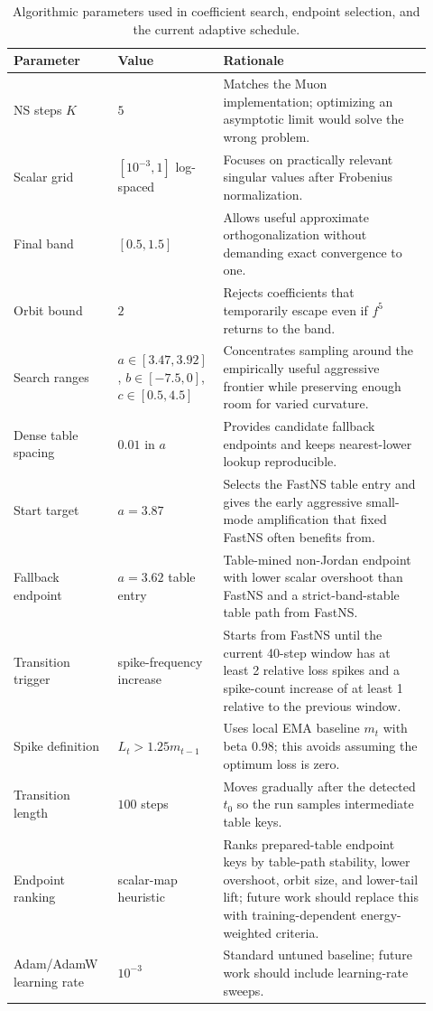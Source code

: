 \documentclass[11pt]{article}
\begin{document}
\begin{table}[H]
\centering
\small
\begin{tabular}{p{0.24\linewidth}p{0.20\linewidth}p{0.48\linewidth}}
\toprule
Parameter & Value & Rationale \\
\midrule
NS steps $K$ & $5$ & Matches the Muon implementation; optimizing an asymptotic limit would solve the wrong problem. \\
Scalar grid & $[10^{-3},1]$ log-spaced & Focuses on practically relevant singular values after Frobenius normalization. \\
Final band & $[0.5,1.5]$ & Allows useful approximate orthogonalization without demanding exact convergence to one. \\
Orbit bound & $2$ & Rejects coefficients that temporarily escape even if $f^5$ returns to the band. \\
Search ranges & $a\in[3.47,3.92]$, $b\in[-7.5,0]$, $c\in[0.5,4.5]$ & Concentrates sampling around the empirically useful aggressive frontier while preserving enough room for varied curvature. \\
Dense table spacing & $0.01$ in $a$ & Provides candidate fallback endpoints and keeps nearest-lower lookup reproducible. \\
Start target & $a=3.87$ & Selects the FastNS table entry and gives the early aggressive small-mode amplification that fixed FastNS often benefits from. \\
Fallback endpoint & $a=3.62$ table entry & Table-mined non-Jordan endpoint with lower scalar overshoot than FastNS and a strict-band-stable table path from FastNS. \\
Transition trigger & spike-frequency increase & Starts from FastNS until the current 40-step window has at least 2 relative loss spikes and a spike-count increase of at least 1 relative to the previous window. \\
Spike definition & $L_t > 1.25 m_{t-1}$ & Uses local EMA baseline $m_t$ with beta $0.98$; this avoids assuming the optimum loss is zero. \\
Transition length & $100$ steps & Moves gradually after the detected $t_0$ so the run samples intermediate table keys. \\
Endpoint ranking & scalar-map heuristic & Ranks prepared-table endpoint keys by table-path stability, lower overshoot, orbit size, and lower-tail lift; future work should replace this with training-dependent energy-weighted criteria. \\
Adam/AdamW learning rate & $10^{-3}$ & Standard untuned baseline; future work should include learning-rate sweeps. \\
\bottomrule
\end{tabular}
\caption{Algorithmic parameters used in coefficient search, endpoint selection, and the current adaptive schedule.}
\label{tab:algorithm-parameters}
\end{table}
\end{document}
